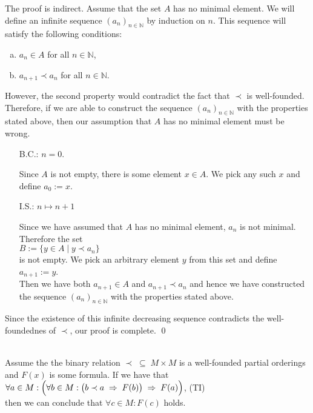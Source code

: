 \proof
The proof is indirect.  Assume that the set $A$ has no minimal element.  We will define an infinite sequence
$(a_n)_{n\in\mathbb{N}}$ by induction on $n$.  This sequence will satisfy the following conditions:
\begin{enumerate}[(a)]
\item $a_n \in A$ \quad for all $n \in \mathbb{N}$,
\item $a_{n+1} \prec a_n$ \quad for all $n \in \mathbb{N}$.
\end{enumerate}
However, the second property would contradict the fact that $\prec$ is well-founded.  Therefore, if we are able
to construct the sequence $(a_n)_{n\in\mathbb{N}}$ with the properties stated above, then our assumption that
$A$ has no minimal element must be wrong.
\begin{enumerate}
\item[B.C.:] $n=0$.

             Since $A$ is not empty, there is some element $x\in A$.  We pick any such $x$ and define $a_0:=x$.
\item[I.S.:] $n \mapsto n+1$

             Since we have assumed that $A$ has no minimal element, $a_n$ is not minimal.  Therefore the set
             \\[0.2cm]
             \hspace*{1.3cm}
             $B := \{ y \in A \mid y \prec a_n \}$ 
             \\[0.2cm]
             is not empty.  We pick an arbitrary element $y$ from this set and define
             \\[0.2cm]
             \hspace*{1.3cm}
             $a_{n+1} := y$.
             \\[0.2cm]
             Then we have both $a_{n+1} \in A$ and $a_{n+1} \prec a_n$ and hence we have constructed
             the sequence $(a_{n})_{n\in\mathbb{N}}$ with the properties stated above.
\end{enumerate}
Since the existence of this infinite decreasing sequence contradicts the well-foundednes of $\prec$, our proof
is complete. \qed

\begin{Theorem}
  \hspace*{\fill} \\
  Assume the the binary relation $\prec \;\subseteq\; M \times M$ is a well-founded partial orderings and $F(x)$ is some formula.
  If we have that
  \\[0.2cm]
  \hspace*{1.3cm}
  $\forall a \in M: \Bigl(\forall b \in M: \bigl( b \prec a \;\Rightarrow\; F(b)\bigr) \;\Rightarrow\; F(a)\Bigr)$, \hspace*{\fill} (TI)
  \\[0.2cm]
  then we can conclude that $\forall c \in M: F(c)$ holds.
\end{Theorem}

